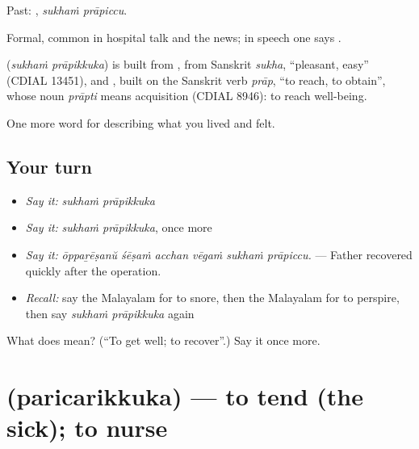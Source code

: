 Past:  , \emph{sukhaṁ prāpiccu}.

Formal, common in hospital talk and the news; in speech one says  .

\begin{cousinweb}
\textbf{ } (\emph{sukhaṁ prāpikkuka}) is built from , from Sanskrit \emph{sukha}, \textquotedblleft{}pleasant, easy\textquotedblright{} (CDIAL 13451), and , built on the Sanskrit verb \emph{prāp}, \textquotedblleft{}to reach, to obtain\textquotedblright{}, whose noun \emph{prāpti} means acquisition (CDIAL 8946): to reach well-being.
\end{cousinweb}

\begin{grammarlens}[title={What you've built}]
One more word for describing what you lived and felt.
\end{grammarlens}

\subsection*{Your turn}
\begin{itemize}
\raggedright
  \item \emph{Say it:} \emph{sukhaṁ prāpikkuka}
  \item \emph{Say it:} \emph{sukhaṁ prāpikkuka}, once more
  \item \emph{Say it:} \emph{ōppaṟēṣanŭ śēṣaṁ acchan vēgaṁ sukhaṁ prāpiccu.} — Father recovered quickly after the operation.
  \item \emph{Recall:} say the Malayalam for to snore, then the Malayalam for to perspire, then say \emph{sukhaṁ prāpikkuka} again
\end{itemize}

\begin{tcolorbox}[breakable,colback=teal!4,colframe=teal!35!black,title={Before you move on}]
What does   mean? (\textquotedblleft{}To get well; to recover\textquotedblright{}.) Say it once more.
\end{tcolorbox}
\section[\texorpdfstring{\ml{പരിചരിക്കുക} (paricarikkuka)}{പരിചരിക്കുക (paricarikkuka)}]{ (paricarikkuka) — to tend (the sick); to nurse}

\label{lesson:ML-C538-paricarikkuka}



